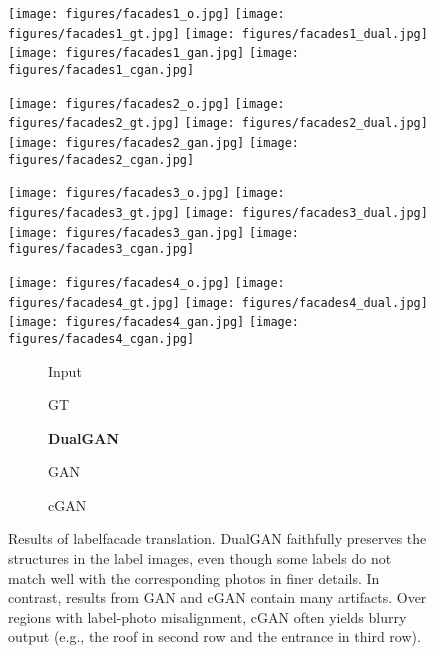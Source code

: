 \begin{figure}
\begin{center}
\texttt{[image: figures/facades1\_o.jpg]}
\texttt{[image: figures/facades1\_gt.jpg]}
\texttt{[image: figures/facades1\_dual.jpg]}
\texttt{[image: figures/facades1\_gan.jpg]}
\texttt{[image: figures/facades1\_cgan.jpg]}

\texttt{[image: figures/facades2\_o.jpg]}
\texttt{[image: figures/facades2\_gt.jpg]}
\texttt{[image: figures/facades2\_dual.jpg]}
\texttt{[image: figures/facades2\_gan.jpg]}
\texttt{[image: figures/facades2\_cgan.jpg]}

\texttt{[image: figures/facades3\_o.jpg]}
\texttt{[image: figures/facades3\_gt.jpg]}
\texttt{[image: figures/facades3\_dual.jpg]}
\texttt{[image: figures/facades3\_gan.jpg]}
\texttt{[image: figures/facades3\_cgan.jpg]}

\texttt{[image: figures/facades4\_o.jpg]}
\texttt{[image: figures/facades4\_gt.jpg]}
\texttt{[image: figures/facades4\_dual.jpg]}
\texttt{[image: figures/facades4\_gan.jpg]}
\texttt{[image: figures/facades4\_cgan.jpg]}

\begin{subfigure}[]{0.19\linewidth}\caption*{Input}\end{subfigure}
\begin{subfigure}[]{0.19\linewidth}\caption*{GT}\end{subfigure}
\begin{subfigure}[]{0.19\linewidth}\caption*{\textbf{DualGAN}}\end{subfigure}
\begin{subfigure}[]{0.19\linewidth}\caption*{GAN}\end{subfigure}
\begin{subfigure}[]{0.19\linewidth}\caption*{cGAN~\cite{isola2016image}}\end{subfigure}
\caption{Results of labelfacade translation. DualGAN faithfully preserves the structures 
in the label images, even though some labels do not match well with the corresponding photos
in finer details. In contrast, results from GAN and cGAN contain many artifacts. Over regions with
label-photo misalignment, cGAN often yields blurry output (e.g., the roof in second row and 
the entrance in third row).}
\label{fig:facades}
\end{center}
\end{figure}

